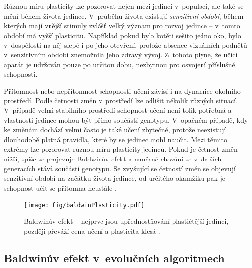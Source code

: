 Různou míru plasticity lze pozorovat nejen mezi jedinci v~populaci, ale také se mění během života jedince. V~průběhu života existují \emph{senzitivní období}, během kterých mají vnější stimuly zvlášť velký význam pro rozvoj jedince -- v~tomto období má vyšší plasticitu. Například pokud bylo kotěti sešito jedno oko, bylo v~dospělosti na něj slepé i po jeho otevření, protože absence vizuálních podnětů v~senzitivním období znemožnila jeho zdravý vývoj. Z~tohoto plyne, že učící aparát je udržován pouze po určitou dobu, nezbytnou pro osvojení příslušné schopnosti.

Přítomnost nebo nepřítomnost schopnosti učení závisí i na dynamice okolního prostředí. Podle četnosti změn v~prostředí lze odlišit několik různých situací. V~případě velmi stabilního prostředí schopnost učení není tolik potřebná a vlastnosti jedince mohou být přímo součástí genotypu. V~opačném případě, kdy ke změnám dochází velmi často je také učení zbytečné, protože neexistují dlouhodobě platná pravidla, které by se jedinec mohl naučit. Mezi těmito extrémy lze pozorovat různou míru plasticity jedinců. Pokud je četnost změn nižší, spíše se projevuje Baldwinův efekt a naučené chování se v~dalších generacích stává součástí genotypu. Se zvyšující se četností změn se objevují senzitivní období na začátku života jedince, od určitého okamžiku pak je schopnost učit se přítomna neustále \cite{EllefsenBalancing}.

\begin{figure}[htb]
    \centering\texttt{[image: fig/baldwinPlasticity.pdf]}
    \caption{Baldwinův efekt -- nejprve jsou upřednostňování plastičtější jedinci, později převáží cena učení a plasticita klesá \cite{EllefsenBalancing}.}
    \label{obrBaldwin}
\end{figure}

\subsection{Baldwinův efekt v~evolučních algoritmech}

